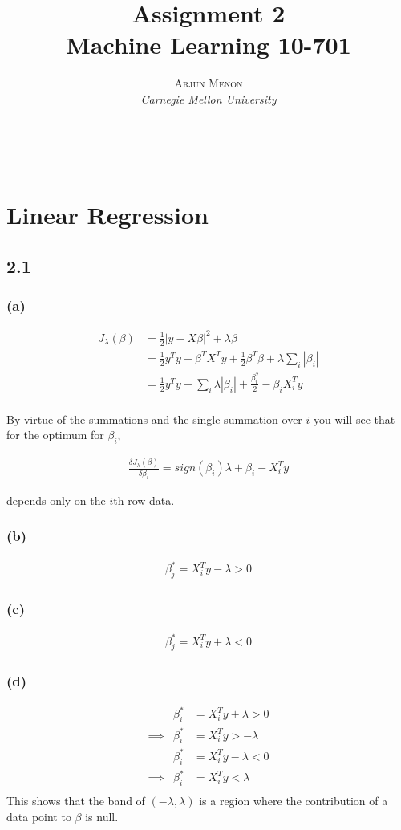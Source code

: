 \documentclass[letterpaper,10pt]{article} %
\title{\textbf{Assignment 2}\\ %
Machine Learning 10-701} %
\author{\textsc{Arjun Menon} %
\\{\textit{Carnegie Mellon University}}} %
\makeatletter
\newcommand{\norm}[1]{\left|#1\right|}
\newcommand{\lm}{\lambda}
\newcommand{\difrac}[2]{\frac{\delta #1}{\delta #2}}
\renewcommand{\maketitle}{ %
\begin{flushright} %
{\LARGE\@title} %

{\large\@author} %
\\\@date %

\end{flushright}
}
\makeatother
\begin{document}
\maketitle %

\section{Linear Regression}
\subsection{2.1}
\subsubsection*{(a)}
\begin{align*}
J_{\lm}(\beta) &= \tfrac{1}{2} \norm{y-X\beta}^2 +\lm\beta\\
&= \tfrac{1}{2}y^Ty-\beta^T X^T y+\tfrac{1}{2}\beta^T\beta +\lm\sum_i{\norm{\beta_i}}\\
&= \tfrac{1}{2}y^Ty +\sum_i{\lm\norm{\beta_i}+\frac{\beta_i^2}{2}-\beta_i X_i^T y}\\
\end{align*}

By virtue of the summations and the single summation over $i$ you will see that for the optimum for $\beta_i$,

\begin{align*}
\difrac{J_{\lm}(\beta)}{\beta_i} = sign(\beta_i)\lm + \beta_i - X_i^T y
\end{align*}

depends only on the $i$th row data.

\subsubsection*{(b)}
\begin{align*}
\beta^{*}_j = X_i^Ty-\lm > 0
\end{align*}
\subsubsection*{(c)}
\begin{align*}
\beta^{*}_j = X_i^Ty+\lm < 0
\end{align*}
\subsubsection*{(d)}
\begin{align*}
&\beta^{*}_i &= X_i^Ty+\lm > 0\\
\implies&\beta^{*}_i &= X_i^Ty > -\lm\\
&\beta^{*}_i &= X_i^Ty-\lm < 0\\
\implies&\beta^{*}_i &= X_i^Ty < \lm\\
\end{align*}
This shows that the band of $(-\lm,\lm)$ is a region where the contribution of a data point to $\beta$ is null.
\end{document}
